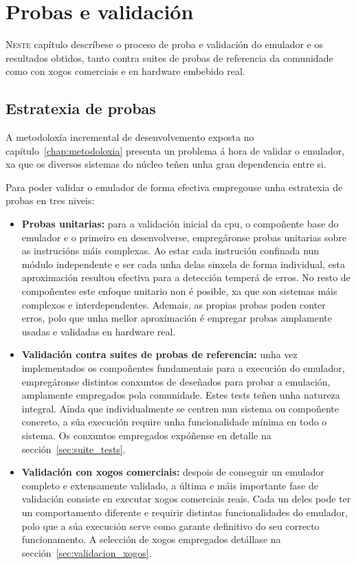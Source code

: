\chapter{Probas e validación}
\label{chap:validacion}

\lettrine{N}{este} capítulo descríbese o proceso de proba e validación do emulador
e os resultados obtidos, tanto contra suites de probas de referencia da comunidade
como con xogos comerciais e en hardware embebido real.

\section{Estratexia de probas}
A metodoloxía incremental de desenvolvemento exposta no capítulo~\ref{chap:metodoloxia}
presenta un problema á hora de validar o emulador,
xa que os diversos sistemas do núcleo teñen unha gran dependencia entre si.

Para poder validar o emulador de forma efectiva empregouse unha estratexia de probas en tres niveis:
\begin{itemize}
    \item \textbf{Probas unitarias:} para a validación inicial da \acrshort{cpu}, o compoñente base do emulador e o primeiro en desenvolverse,
    empregáronse probas unitarias sobre as instrucións máis complexas.
    Ao estar cada instrución confinada nun módulo independente e ser cada unha delas sinxela de forma individual,
    esta aproximación resultou efectiva para a detección temperá de erros. No resto de compoñentes este enfoque unitario non é posible,
    xa que son sistemas máis complexos e interdependentes. Ademais, as propias probas poden conter erros, polo que unha mellor aproximación
    é empregar probas amplamente usadas e validadas en hardware real.

    \item \textbf{Validación contra suites de probas de referencia:} unha vez implementados os compoñentes fundamentais para a execución do emulador,
    empregáronse distintos conxuntos de  deseñados para probar a emulación, amplamente empregados pola comunidade.
    Estes tests teñen unha natureza integral. Aínda que individualmente se centren nun sistema ou compoñente concreto, a súa execución require unha funcionalidade
    mínima en todo o sistema. Os conxuntos empregados expóñense en detalle na sección~\ref{sec:suite_tests}.

    \item \textbf{Validación con xogos comerciais:} despois de conseguir un emulador completo e extensamente validado, a última e máis importante fase de validación consiste
    en executar xogos comerciais reais. Cada un deles pode ter un comportamento diferente e requirir distintas funcionalidades do emulador,
    polo que a súa execución serve como garante definitivo do seu correcto funcionamento. A selección de xogos empregados detállase na sección~\ref{sec:validacion_xogos}.
\end{itemize}


